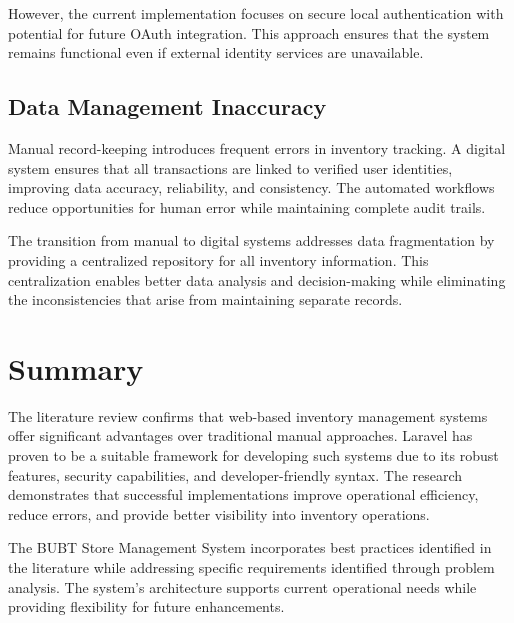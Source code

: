However, the current implementation focuses on secure local authentication with potential for future OAuth integration. This approach ensures that the system remains functional even if external identity services are unavailable.

\subsection{Data Management Inaccuracy}

Manual record-keeping introduces frequent errors in inventory tracking. A digital system ensures that all transactions are linked to verified user identities, improving data accuracy, reliability, and consistency. The automated workflows reduce opportunities for human error while maintaining complete audit trails.

The transition from manual to digital systems addresses data fragmentation by providing a centralized repository for all inventory information. This centralization enables better data analysis and decision-making while eliminating the inconsistencies that arise from maintaining separate records.

\section{Summary}

The literature review confirms that web-based inventory management systems offer significant advantages over traditional manual approaches. Laravel has proven to be a suitable framework for developing such systems due to its robust features, security capabilities, and developer-friendly syntax. The research demonstrates that successful implementations improve operational efficiency, reduce errors, and provide better visibility into inventory operations.

The BUBT Store Management System incorporates best practices identified in the literature while addressing specific requirements identified through problem analysis. The system's architecture supports current operational needs while providing flexibility for future enhancements.